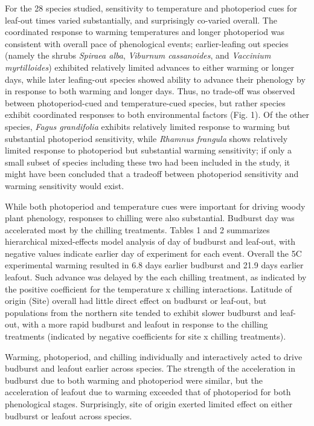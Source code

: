 \documentclass{article}
\begin{document}
For the 28 species studied, sensitivity to temperature and photoperiod cues for leaf-out times varied substantially, and surprisingly co-varied overall. The coordinated response to warming temperatures and longer photoperiod was consistent with overall pace of phenological events; earlier-leafing out species (namely the shrubs \emph{Spiraea alba}, \emph{Viburnum cassanoides}, and \emph{Vaccinium myrtilloides}) exhibited relatively limited advances to either warming or longer days, while later leafing-out species showed ability to advance their phenology by in response to both warming and longer days. Thus, no trade-off was observed between photoperiod-cued and temperature-cued species, but rather species exhibit coordinated responses to both environmental factors (Fig. 1). Of the other species, \emph{Fagus grandifolia} exhibits relatively limited response to warming but substantial photoperiod sensitivity, while \emph{Rhamnus frangula} shows relatively limited response to photoperiod but substantial warming sensitivity; if only a small subset of species including these two had been included in the study, it might have been concluded that a tradeoff between photoperiod sensitivity and warming sensitivity would exist.

While both photoperiod and temperature cues were important for driving woody plant phenology, responses to chilling were also substantial. Budburst day was accelerated most by the chilling treatments. Tables 1 and 2 summarizes hierarchical mixed-effects model analysis of day of budburst and leaf-out, with negative values indicate earlier day of experiment for each event. Overall the 5\degree C experimental warming resulted in 6.8 days earlier budburst and 21.9 days earlier leafout. Such advance was delayed by the each chilling treatment, as indicated by the positive coefficient for the temperature x chilling interactions. Latitude of origin (Site) overall had little direct effect on budburst or leaf-out, but populations from the northern site tended to exhibit slower budburst and leaf-out, with a more rapid budburst and leafout in response to the chilling treatments (indicated by negative coefficients for site x chilling treatments).

Warming, photoperiod, and chilling individually and interactively acted to drive budburst and leafout earlier across species. The strength of the acceleration in budburst due to both warming and photoperiod were similar, but the acceleration of leafout due to warming exceeded that of photoperiod for both phenological stages. Surprisingly, site of origin exerted limited effect on either budburst or leafout across species. 
\end{document}
